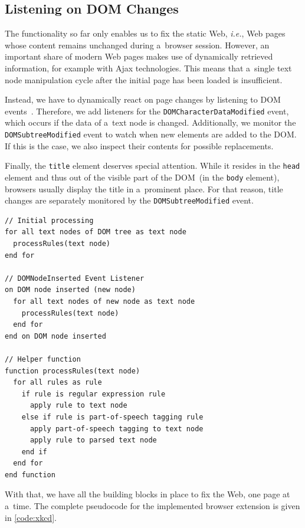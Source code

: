 \documentclass{acm_proc_article-sp}
\let\oldemph\emph
\renewcommand{\emph}[1]{\oldemph{\fontsize{9}{9}\selectfont #1}}
\begin{document}
\subsection{Listening on DOM Changes}
The functionality so far only enables us to fix the static Web, \emph{i.e.}, Web pages whose content remains unchanged during a~browser session.
However, an important share of modern Web pages makes use of dynamically retrieved information, for example with Ajax technologies.
This means that a~single text node manipulation cycle after the initial page has been loaded is insufficient.

Instead, we have to dynamically react on page changes by listening to DOM events~\cite{w3cevents2011}.
Therefore, we add listeners for the \Verb!DOMCharacterDataModified! event, which occurs if the data of a~text node is changed.
Additionally, we monitor the \Verb!DOMSubtreeModified! event to watch when new elements are added to the DOM.
If this is the case, we also inspect their contents for possible replacements.

Finally, the \Verb!title! element deserves special attention.
While it resides in the \Verb!head! element and thus out of the visible part of the DOM~(in the \Verb!body! element),
browsers usually display the title in a~prominent place.
For that reason, title changes are separately monitored by the \Verb!DOMSubtreeModified! event.

\begin{lstlisting}[caption=Pseudocode for the browser extension's logic., label=code:xkcd, float=h]
// Initial processing
for all text nodes of DOM tree as text node
  processRules(text node)
end for  

// DOMNodeInserted Event Listener
on DOM node inserted (new node)
  for all text nodes of new node as text node
    processRules(text node)
  end for  
end on DOM node inserted

// Helper function
function processRules(text node)
  for all rules as rule
    if rule is regular expression rule
      apply rule to text node
    else if rule is part-of-speech tagging rule
      apply part-of-speech tagging to text node
      apply rule to parsed text node
    end if
  end for
end function  
\end{lstlisting} 

With that, we have all the building blocks in place to fix the Web, one page at a~time.
The complete pseudocode for the implemented browser extension is given in \autoref{code:xkcd}.
\end{document}
